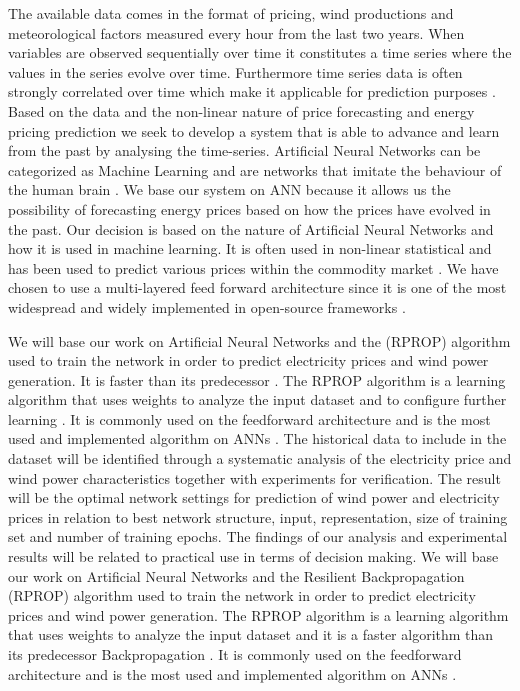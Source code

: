 The available data comes in the format of pricing, wind productions and meteorological factors measured every hour from the last two years. When variables are observed sequentially over time it constitutes a time series where the values in the series evolve over time. Furthermore time series data is often strongly correlated over time which make it applicable for prediction purposes \cite[Chapter~7.1.2]{econometrics}. Based on the data and the non-linear nature of price forecasting and energy pricing prediction we seek to develop a system that is able to advance and learn from the past by analysing the time-series. Artificial Neural Networks can be categorized as Machine Learning \cite{18} and are networks that imitate the behaviour of the human brain \cite{1}. We base our system on ANN because it allows us the possibility of forecasting energy prices based on how the prices have evolved in the past. Our decision is based on the nature of Artificial Neural Networks and how it is used in machine learning. It is often used in non-linear statistical  and has been used to predict various prices within the commodity market \cite{2,3,stockForecasting,pjmForecast}. We have chosen to use a multi-layered feed forward architecture since it is one of the most widespread and widely implemented in open-source frameworks \cite{17}.

We will base our work on Artificial Neural Networks and the  (RPROP) algorithm used to train the network in order to predict electricity prices and wind power generation. It is faster than its predecessor  \cite{15}. The RPROP algorithm is a learning algorithm that uses weights to analyze the input dataset and to configure further learning \cite{17}. It is commonly used on the feedforward architecture and is the most used and implemented algorithm on ANNs \cite{17}. The historical data to include in the dataset will be identified through a systematic analysis of the electricity price and wind power characteristics together with experiments for verification. The result will be the optimal network settings for prediction of wind power and electricity prices in relation to best network structure, input, representation, size of training set and number of training epochs. The findings of our analysis and experimental results will be related to practical use in terms of decision making. We will base our work on Artificial Neural Networks and the Resilient Backpropagation (RPROP) algorithm used to train the network in order to predict electricity prices and wind power generation. The RPROP algorithm is a learning algorithm that uses weights to analyze the input dataset\cite{17} and it is a faster algorithm than its predecessor Backpropagation \cite{15}. It is commonly used on the feedforward architecture and is the most used and implemented algorithm on ANNs \cite{17}.

